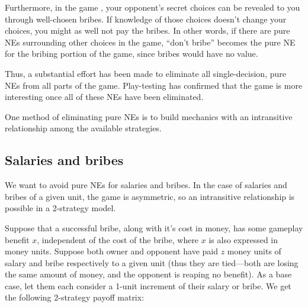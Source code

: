 Furthermore, in the game \gtitle, your opponent's secret choices can be revealed to you through well-chosen bribes.  If knowledge of those choices doesn't change your choices, you might as well not pay the bribes.  In other words, if there are pure NEs surrounding other choices in the game, ``don't bribe'' becomes the pure NE for the bribing portion of the game, since bribes would have no value.

Thus, a substantial effort has been made to eliminate all single-decision, pure NEs from all parts of the game.  Play-testing has confirmed that the game is more interesting once all of these NEs have been eliminated.

One method of eliminating pure NEs is to build mechanics with an intransitive relationship among the available strategies.


\subsection{Salaries and bribes}
We want to avoid pure NEs for salaries and bribes.  In the case of salaries and bribes of a given unit, the game is asymmetric, so an intransitive relationship is possible in a 2-strategy model.

Suppose that a successful bribe, along with it's cost in money, has some gameplay benefit $x$, independent of the cost of the bribe, where $x$ is also expressed in money units.  Suppose both owner and opponent have paid $z$ money units of salary and bribe respectively to a given unit (thus they are tied---both are losing the same amount of money, and the opponent is reaping no benefit).  As a base case, let them each consider a 1-unit increment of their salary or bribe.  We get the following 2-strategy payoff matrix:

\newcommand{\oldtablesep}{\tabcolsep}
\newcommand{\maintablesep}{0.035in}

\newcommand{\payoff}[5]{
\begin{tabular}{cc}
{\sc #3}&{\sc #4}\\
(#1)&(#2)\\
\multicolumn{2}{c}{{\sc #5}}
\end{tabular}
}



